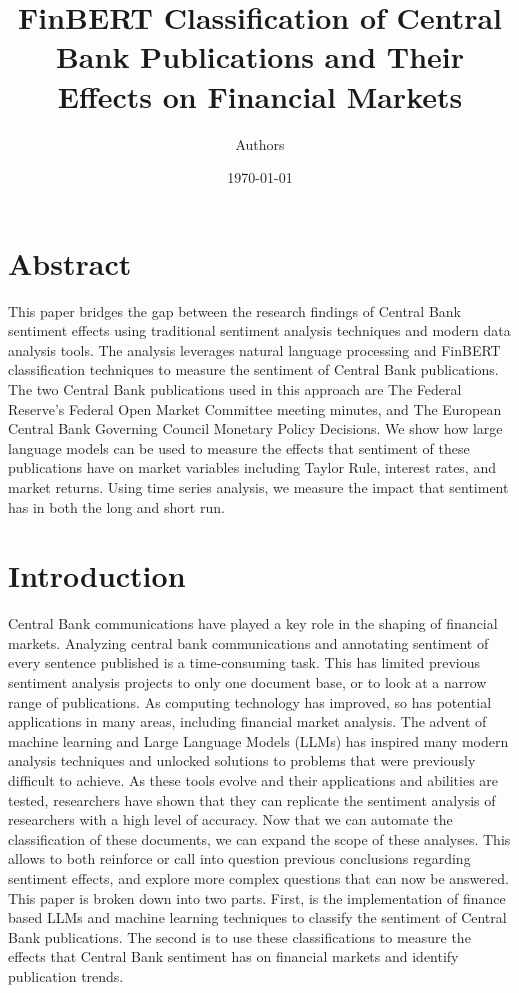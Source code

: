 \documentclass[12pt, letterpaper]{article}
\begin{document}
\title{FinBERT Classification of Central Bank Publications and Their Effects on Financial Markets}
\author{Authors}

\date{\today}

\maketitle

\section{Abstract}
This paper bridges the gap between the research findings of Central Bank sentiment effects using traditional sentiment analysis techniques and modern data analysis tools. The analysis leverages natural language processing and FinBERT classification techniques to measure the sentiment of Central Bank publications. The two Central Bank publications used in this approach are The Federal Reserve's Federal Open Market Committee meeting minutes, and The European Central Bank Governing Council Monetary Policy Decisions. We show how large language models can be used to measure the effects that sentiment of these publications have on market variables including Taylor Rule, interest rates, and market returns. Using time series analysis, we measure the impact that sentiment has in both the long and short run. 

\section{Introduction}
Central Bank communications have played a key role in the shaping of financial markets. Analyzing central bank communications and annotating sentiment of every sentence published is a time-consuming task. This has limited previous sentiment analysis projects to only one document base, or to look at a narrow range of publications. As computing technology has improved, so has potential applications in many areas, including financial market analysis. The advent of machine learning and Large Language Models (LLMs) has inspired many modern analysis techniques and unlocked solutions to problems that were previously difficult to achieve. As these tools evolve and their applications and abilities are tested, researchers have shown that they can replicate the sentiment analysis of researchers with a high level of accuracy. Now that we can automate the classification of these documents, we can expand the scope of these analyses. This allows to both reinforce or call into question previous conclusions regarding sentiment effects, and explore more complex questions that can now be answered.  This paper is broken down into two parts. First, is the implementation of finance based LLMs and machine learning techniques to classify the sentiment of Central Bank publications. The second is to use these classifications to measure the effects that Central Bank sentiment has on financial markets and identify publication trends. 
\end{document}
